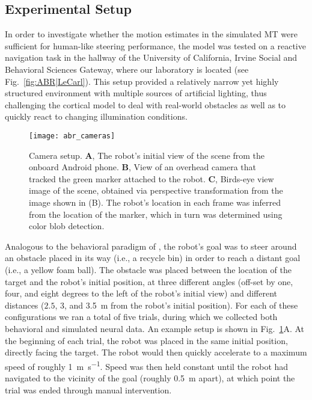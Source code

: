 \subsection{Experimental Setup}
In order to investigate whether the motion estimates in the simulated
\ac{MT} were sufficient for human-like steering performance,
the model was tested on a reactive navigation task in the hallway
of the University of California, Irvine Social and Behavioral Sciences
Gateway, where our laboratory is located 
(see Fig.~\ref{fig:ABR|LeCarl}). This
setup provided a relatively narrow yet highly structured environment
with multiple sources of artificial lighting, thus challenging
the cortical model to deal with real-world obstacles as well as to
quickly react to changing illumination conditions.

\begin{figure}[t]
  \centering
  \texttt{[image: abr\_cameras]}
  \caption{
  Camera setup.
  \textbf{A}, The robot's initial view of the scene from the onboard
	Android phone.
  \textbf{B}, View of an overhead camera that tracked the green marker
	attached to the robot. 
  \textbf{C}, Birds-eye view image of the scene, obtained via
	perspective transformation from the image shown in (B).
	The robot's location in each frame was inferred from the location 
    of the marker, which in turn was determined using color blob detection.}   \label{fig:ABR|cameras}
\end{figure}

Analogous to the behavioral paradigm of \cite{FajenWarren2003},
the robot's goal was to steer around an obstacle placed in
its way (i.e., a recycle bin) in order to reach a distant goal (i.e., a
yellow foam ball). The obstacle was placed between the location of
the target and the robot's initial position, at three different angles
(off-set by one, four, and eight degrees to the left of the robot's
initial view) and different distances ($2.5$, $3$, and \SI{3.5}{\meter}
from the
robot's initial position). For each of these configurations we ran
a total of five trials, during which we collected both behavioral
and simulated neural data. An example setup is shown in 
Fig.~\ref{fig:ABR|cameras}A.
At the beginning of each trial, the robot was placed in the same
initial position, directly facing the target. The robot would then
quickly accelerate to a maximum speed of roughly \SI{1}{\meter\per\second}. 
Speed was then held constant until the robot had navigated to the vicinity
of the goal (roughly \SI{0.5}{\meter} apart), 
at which point the trial was ended through manual intervention.


